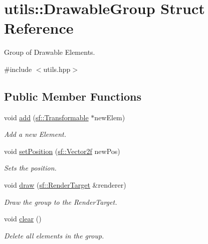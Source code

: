 \hypertarget{structutils_1_1_drawable_group}{}\section{utils\+:\+:Drawable\+Group Struct Reference}
\label{structutils_1_1_drawable_group}


Group of Drawable Elements.  




{\ttfamily \#include $<$utils.\+hpp$>$}

\subsection*{Public Member Functions}
\begin{DoxyCompactItemize}
\item 
void \mbox{\hyperlink{structutils_1_1_drawable_group_a941d5d27a0fd5d712f833df263c72dce}{add}} (\mbox{\hyperlink{classsf_1_1_transformable}{sf\+::\+Transformable}} $\ast$new\+Elem)
\begin{DoxyCompactList}\small\item\em Add a new Element. \end{DoxyCompactList}\item 
\mbox{\label{structutils_1_1_drawable_group_ab39769624b4edcada2483cce8e141e68}} 
void \mbox{\hyperlink{structutils_1_1_drawable_group_ab39769624b4edcada2483cce8e141e68}{set\+Position}} (\mbox{\hyperlink{classsf_1_1_vector2}{sf\+::\+Vector2f}} new\+Pos)
\begin{DoxyCompactList}\small\item\em Sets the position. \end{DoxyCompactList}\item 
void \mbox{\hyperlink{structutils_1_1_drawable_group_ae7d89c917c5758ac7e9020f332b2b9d8}{draw}} (\mbox{\hyperlink{classsf_1_1_render_target}{sf\+::\+Render\+Target}} \&renderer)
\begin{DoxyCompactList}\small\item\em Draw the group to the Render\+Target. \end{DoxyCompactList}\item 
\mbox{\label{structutils_1_1_drawable_group_a81e3fc72bad8af65c9629471be3baaaa}} 
void \mbox{\hyperlink{structutils_1_1_drawable_group_a81e3fc72bad8af65c9629471be3baaaa}{clear}} ()
\begin{DoxyCompactList}\small\item\em Delete all elements in the group. \end{DoxyCompactList}\end{DoxyCompactItemize}
